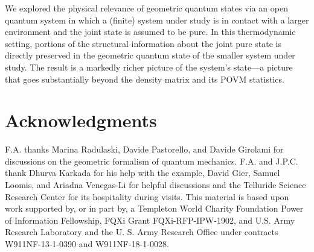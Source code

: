 \documentclass[nofootinbib,pre,twocolumn,showpacs,showkeys,groupaddress,preprintnumbers,floatfix]{revtex4-1}
\newcommand{\1}{\mathbbm{1}}
\begin{document}
We explored the physical relevance of geometric quantum states via an open
quantum system in which a (finite) system under study is in contact with a
larger environment and the joint state is assumed to be pure. In this
thermodynamic setting, portions of the structural information about the joint
pure state is directly preserved in the geometric quantum state of the smaller
system under study. The result is a markedly richer picture of the system's
state---a picture that goes substantially beyond the density matrix and its
POVM statistics.

\section*{Acknowledgments}
\label{sec:acknowledgments}

F.A. thanks Marina Radulaski, Davide Pastorello, and Davide Girolami for
discussions on the geometric formalism of quantum mechanics. F.A. and J.P.C.
thank Dhurva Karkada for his help with the example, David Gier, Samuel Loomis, 
and Ariadna Venegas-Li for helpful discussions and the Telluride Science Research 
Center for its hospitality during visits.  This material is based upon work supported 
by, or in part by, a Templeton World Charity Foundation Power of Information
Fellowship, FQXi Grant FQXi-RFP-IPW-1902, and U.S. Army Research Laboratory 
and the U. S. Army Research Office under contracts W911NF-13-1-0390 and
W911NF-18-1-0028.
\end{document}
